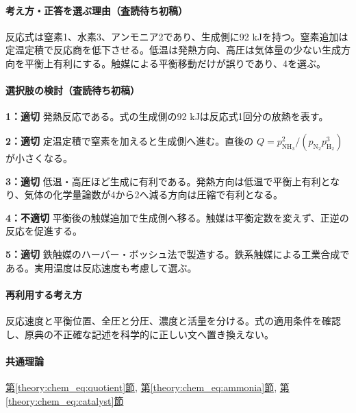 \paragraph{考え方・正答を選ぶ理由（査読待ち初稿）} 反応式は窒素1、水素3、アンモニア2であり、生成側に92 kJを持つ。窒素追加は定温定積で反応商を低下させる。低温は発熱方向、高圧は気体量の少ない生成方向を平衡上有利にする。触媒による平衡移動だけが誤りであり、4を選ぶ。

\paragraph{選択肢の検討（査読待ち初稿）}\mbox{}\par

\noindent\textbf{1：適切} 発熱反応である。式の生成側の92 kJは反応式1回分の放熱を表す。\par

\noindent\textbf{2：適切} 定温定積で窒素を加えると生成側へ進む。直後の \(Q=p_{\mathrm{NH_3}}^2/(p_{\mathrm{N_2}}p_{\mathrm{H_2}}^3)\) が小さくなる。\par

\noindent\textbf{3：適切} 低温・高圧ほど生成に有利である。発熱方向は低温で平衡上有利となり、気体の化学量論数が4から2へ減る方向は圧縮で有利となる。\par

\noindent\textbf{4：不適切} 平衡後の触媒追加で生成側へ移る。触媒は平衡定数を変えず、正逆の反応を促進する。\par

\noindent\textbf{5：適切} 鉄触媒のハーバー・ボッシュ法で製造する。鉄系触媒による工業合成である。実用温度は反応速度も考慮して選ぶ。\par

\paragraph{再利用する考え方} 反応速度と平衡位置、全圧と分圧、濃度と活量を分ける。式の適用条件を確認し、原典の不正確な記述を科学的に正しい文へ置き換えない。

\paragraph{共通理論} \hyperref[theory:chem_eq:quotient]{第\ref*{theory:chem_eq:quotient}節}, \hyperref[theory:chem_eq:ammonia]{第\ref*{theory:chem_eq:ammonia}節}, \hyperref[theory:chem_eq:catalyst]{第\ref*{theory:chem_eq:catalyst}節}

